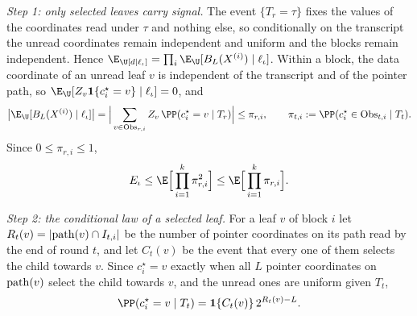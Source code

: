 \emph{Step 1: only selected leaves carry signal.}
The event $\{T_r=\tau\}$ fixes the values of the coordinates read under
$\tau$ and nothing else, so conditionally on the transcript the unread
coordinates remain independent and uniform and the blocks remain
independent. Hence
$\E_\U[d\mid\ell_\iota]=\prod_i\E_\U[B_L(X^{(i)})\mid\ell_\iota]$. Within a
block, the data coordinate of an unread leaf $v$ is independent of the
transcript and of the pointer path, so
$\E_\U[Z_v\mathbf 1\{c^\star_i=v\}\mid\ell_\iota]=0$, and
\[
 \big|\E_\U[B_L(X^{(i)})\mid\ell_\iota]\big|
 =\Big|\sum_{v\in{\rm Obs}_{r,i}}Z_v\,\PP(c_i^\star=v\mid T_r)\Big|
 \le\pi_{r,i},\qquad \pi_{t,i}:=\PP(c_i^\star\in{\rm Obs}_{t,i}\mid T_t).
\]
Since $0\le\pi_{r,i}\le1$,
\begin{equation}
 E_\iota\le\E\Big[\prod_{i=1}^k\pi_{r,i}^2\Big]\le\E\Big[\prod_{i=1}^k\pi_{r,i}\Big].\label{eq:allhit}
\end{equation}

\emph{Step 2: the conditional law of a selected leaf.}
For a leaf $v$ of block $i$ let $R_t(v)=|{\rm path}(v)\cap I_{t,i}|$ be the
number of pointer coordinates on its path read by the end of round $t$, and
let $C_t(v)$ be the event that every one of them selects the child towards
$v$. Since $c_i^\star=v$ exactly when all $L$ pointer coordinates on
${\rm path}(v)$ select the child towards $v$, and the unread ones are
uniform given $T_t$,
\begin{equation}
 \PP(c_i^\star=v\mid T_t)=\mathbf 1\{C_t(v)\}\,2^{R_t(v)-L}.\label{eq:leaflaw}
\end{equation}

